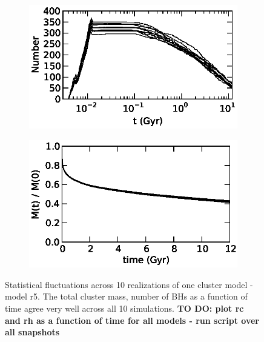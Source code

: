 \documentclass[12pt,preprint]{aastex}
\begin{document}
\begin{figure}
	\centering
       
        \begin{subfigure}[b]{0.45\textwidth}
                \includegraphics[width=\textwidth]{./plots/r5_repeat10_bh_ret_timevolution.eps}

                \label{fig:repeat10_bhs}
        \end{subfigure}     
        \begin{subfigure}[b]{0.5\textwidth}
                \includegraphics[width=\textwidth]{./plots/r5_repeat10_mass_timeevolution.eps}
                \label{fig:repeat10_mass}
        \end{subfigure}     


	\caption{Statistical fluctuations across 10 realizations of one cluster model - model r5. The total cluster mass, number of BHs as a function of time agree very well across all 10 simulations. \bf{TO DO: plot rc and rh as a function of time for all models - run script over all snapshots}}

\end{figure}
\end{document}
